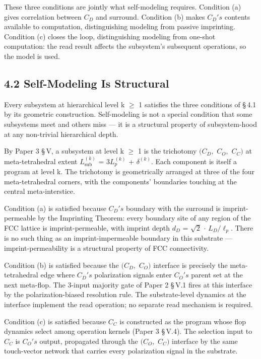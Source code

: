 \documentclass[11pt,oneside]{report}
\theoremstyle{definition}
\theoremstyle{remark}
\begin{document}
These three conditions are jointly what self-modeling requires.
Condition (a) gives correlation between \ensuremath{C_{D}} and surround. Condition (b)
makes \ensuremath{C_{D}'s} contents available to computation, distinguishing modeling
from passive imprinting. Condition (c) closes the loop, distinguishing
modeling from one-shot computation: the read result affects the
subsystem's subsequent operations, so the model is used.

\subsection*{4.2 Self-Modeling Is Structural}

Every subsystem at hierarchical level k \ensuremath{\geq} 1 satisfies the three
conditions of \S\,4.1 by its geometric construction. Self-modeling is not a
special condition that some subsystems meet and others miss --- it is a
structural property of subsystem-hood at any non-trivial hierarchical
depth.

By Paper 3 \S\,V, a subsystem at level k \ensuremath{\geq} 1 is the trichotomy \ensuremath{(C_{D},} \ensuremath{C_{O},}
\ensuremath{C_{C})} at meta-tetrahedral extent \ensuremath{L_{\mathrm{sub}}^{(k)}} = \ensuremath{3L_{p}^{(k)}} +
\ensuremath{\delta ^{(k)}.} Each component is itself a program at level k. The trichotomy
is geometrically arranged at three of the four meta-tetrahedral corners,
with the components' boundaries touching at the central meta-interstice.

Condition (a) is satisfied because \ensuremath{C_{D}'s} boundary with the surround is
imprint-permeable by the Imprinting Theorem: every boundary site of any
region of the FCC lattice is imprint-permeable, with imprint depth \ensuremath{d_{D}}
= \ensuremath{\sqrt{2}} \ensuremath{\cdot} \ensuremath{L_{D}/\ell_{p}.} There is no such thing as an imprint-impermeable
boundary in this substrate --- imprint-permeability is a structural
property of FCC connectivity.

Condition (b) is satisfied because the \ensuremath{(C_{D},} \ensuremath{C_{O})} interface is
precisely the meta-tetrahedral edge where \ensuremath{C_{D}'s} polarization signals
enter \ensuremath{C_{O}'s} parent set at the next meta-flop. The 3-input majority gate
of Paper 2 \S\,V.1 fires at this interface by the polarization-biased
resolution rule. The substrate-level dynamics at the interface implement
the read operation; no separate read mechanism is required.

Condition (c) is satisfied because \ensuremath{C_{C}} is constructed as the program
whose flop dynamics select among operation kernels (Paper 3 \S\,V.4). The
selection input to \ensuremath{C_{C}} is \ensuremath{C_{O}'s} output, propagated through the \ensuremath{(C_{O},}
\ensuremath{C_{C})} interface by the same touch-vector network that carries every
polarization signal in the substrate.
\end{document}
